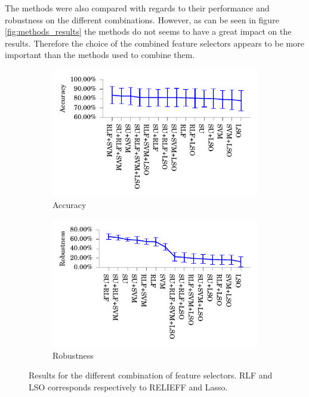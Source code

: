 \documentclass[twoside,11pt]{article}
\begin{document}
The methods were also compared with regards to their performance and robustness on the different combinations. However, as can be seen in figure \ref{fig:methods_results} the methods do not seems to have a great impact on the results. Therefore the choice of the combined feature selectors appears to be more important than the methods used to combine them.

\begin{figure}[!b]
\centering
\begin{subfigure}{.5\textwidth}
  \centering
  \includegraphics[width=1.07\textwidth]{images/Accuracy_of_the_different_combinations.pdf}
  \caption{Accuracy}
  \label{fig:combination_accuracy}
\end{subfigure}%
\begin{subfigure}{.5\textwidth}
  \centering
  \includegraphics[width=1.07\textwidth]{images/Robustness_of_the_different_combinations.pdf}
  \caption{Robustness}
  \label{fig:combination_robustness}
\end{subfigure}
\caption{Results for the different combination of feature selectors. RLF and LSO corresponds respectively to RELIEFF and Lasso.}
\label{fig:combination_results}
\end{figure}
\end{document}
